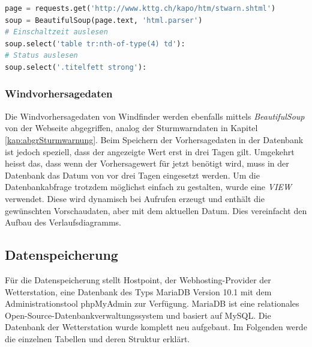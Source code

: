 \begin{lstlisting}[label=lst:kttgCrawler,caption=Web-Scrapper für die Sturmwarndaten, language=python, style=py]
page = requests.get('http://www.kttg.ch/kapo/htm/stwarn.shtml')
soup = BeautifulSoup(page.text, 'html.parser')
# Einschaltzeit auslesen
soup.select('table tr:nth-of-type(4) td'):
# Status auslesen
soup.select('.titelfett strong'):
\end{lstlisting}


\subsubsection{Windvorhersagedaten}
Die Windvorhersagedaten von Windfinder werden ebenfalls mittels \emph{BeautifulSoup} von der Webseite abgegriffen, analog der Sturmwarndaten in Kapitel\,\ref{kap:abgrSturmwarnung}. Beim Speichern der Vorhersagedaten in der Datenbank ist jedoch speziell, dass der angezeigte Wert erst in drei Tagen gilt. Umgekehrt heisst das, dass wenn der Vorhersagewert für jetzt benötigt wird, muss in der Datenbank das Datum von vor drei Tagen eingesetzt werden.
Um die Datenbankabfrage trotzdem möglichst einfach zu gestalten, wurde eine \emph{VIEW} verwendet. Diese wird dynamisch bei Aufrufen erzeugt und enthält die gewünschten Vorschaudaten, aber mit dem aktuellen Datum. Dies vereinfacht den Aufbau des Verlaufsdiagramms.


%
%


\subsection{Datenspeicherung}
Für die Datenspeicherung stellt Hostpoint, der Webhosting-Provider der Wetterstation, eine Datenbank des Typs MariaDB Version 10.1 mit dem Administrationstool phpMyAdmin zur Verfügung. MariaDB ist eine relationales Open-Source-Datenbankverwaltungssystem und basiert auf MySQL. Die Datenbank der Wetterstation wurde komplett neu aufgebaut. Im Folgenden werde die einzelnen Tabellen und deren Struktur erklärt.

